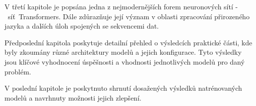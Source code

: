 V třetí kapitole je popsána jedna z nejmodernějších forem neuronových sítí -~síť~Transformers.
Dále zdůrazňuje její význam v oblasti zpracování přirozeného jazyka a dalších úloh spojených se sekvencemi dat.

Předposlední kapitola poskytuje detailní přehled o výsledcích praktické části, kde byly zkoumány různé architektury modelů a jejich konfigurace. Tyto výsledky jsou klíčové vyhodnocení úspěšnosti a vhodnosti jednotlivých modelů pro daný problém.

V poslední kapitole je poskytnuto shrnutí dosažených výsledků natrénovaných modelů a navrhnuty možnosti jejich zlepšení.

\endinput